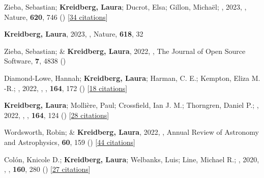 \item[{\color{numcolor}\scriptsize23}] Zieba, Sebastian; \textbf{Kreidberg, Laura}; Ducrot, Elsa; Gillon, Micha{\"e}l; \etal, 2023, , Nature, \textbf{620}, 746 () [\href{https://ui.adsabs.harvard.edu/abs/2023Natur.620..746Z}{34 citations}]

\item[{\color{numcolor}\scriptsize22}] \textbf{Kreidberg, Laura}, 2023, , Nature, \textbf{618}, 32

\item[{\color{numcolor}\scriptsize21}] Zieba, Sebastian; \& \textbf{Kreidberg, Laura}, 2022, , The Journal of Open Source Software, \textbf{7}, 4838 ()

\item[{\color{numcolor}\scriptsize20}] Diamond-Lowe, Hannah; \textbf{Kreidberg, Laura}; Harman, C. E.; Kempton, Eliza M. -R.; \etal, 2022, , \aj, \textbf{164}, 172 () [\href{https://ui.adsabs.harvard.edu/abs/2022AJ....164..172D}{18 citations}]

\item[{\color{numcolor}\scriptsize19}] \textbf{Kreidberg, Laura}; Molli{\`e}re, Paul; Crossfield, Ian J. M.; Thorngren, Daniel P.; \etal, 2022, , \aj, \textbf{164}, 124 () [\href{https://ui.adsabs.harvard.edu/abs/2022AJ....164..124K}{28 citations}]

\item[{\color{numcolor}\scriptsize18}] Wordsworth, Robin; \& \textbf{Kreidberg, Laura}, 2022, , Annual Review of Astronomy and Astrophysics, \textbf{60}, 159 () [\href{https://ui.adsabs.harvard.edu/abs/2022ARA&A..60..159W}{44 citations}]

\item[{\color{numcolor}\scriptsize17}] Col{\'o}n, Knicole D.; \textbf{Kreidberg, Laura}; Welbanks, Luis; Line, Michael R.; \etal, 2020, , \aj, \textbf{160}, 280 () [\href{https://ui.adsabs.harvard.edu/abs/2020AJ....160..280C}{27 citations}]

